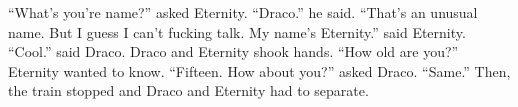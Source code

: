 \begin{sloppypar}
    \enquote{What's you're name?} asked Eternity. \enquote{Draco.} he said. \enquote{That's an unusual name. But I guess I can't fucking talk. My name's Eternity.} said Eternity. \enquote{Cool.} said Draco. Draco and Eternity shook hands. \enquote{How old are you?} Eternity wanted to know. \enquote{Fifteen. How about you?} asked Draco. \enquote{Same.} Then, the train stopped and Draco and Eternity had to separate.
\end{sloppypar}
